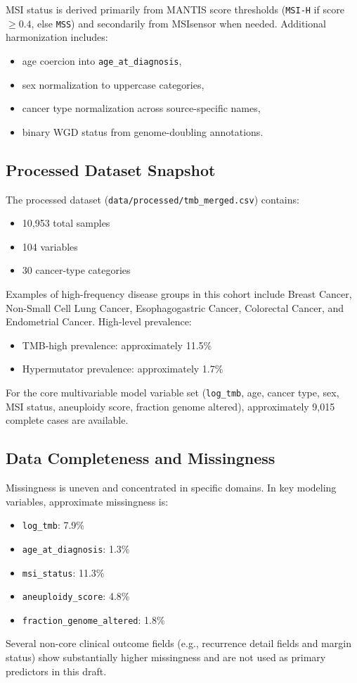 \documentclass[11pt]{article}
\begin{document}
MSI status is derived primarily from MANTIS score thresholds (\texttt{MSI-H} if score $\geq 0.4$, else \texttt{MSS}) and secondarily from MSIsensor when needed. Additional harmonization includes:
\begin{itemize}
    \item age coercion into \texttt{age\_at\_diagnosis},
    \item sex normalization to uppercase categories,
    \item cancer type normalization across source-specific names,
    \item binary WGD status from genome-doubling annotations.
\end{itemize}

\subsection{Processed Dataset Snapshot}
The processed dataset (\texttt{data/processed/tmb\_merged.csv}) contains:
\begin{itemize}
    \item 10,953 total samples
    \item 104 variables
    \item 30 cancer-type categories
\end{itemize}
Examples of high-frequency disease groups in this cohort include Breast Cancer, Non-Small Cell Lung Cancer, Esophagogastric Cancer, Colorectal Cancer, and Endometrial Cancer. High-level prevalence:
\begin{itemize}
    \item TMB-high prevalence: approximately 11.5\%
    \item Hypermutator prevalence: approximately 1.7\%
\end{itemize}
For the core multivariable model variable set (\texttt{log\_tmb}, age, cancer type, sex, MSI status, aneuploidy score, fraction genome altered), approximately 9,015 complete cases are available.

\subsection{Data Completeness and Missingness}
Missingness is uneven and concentrated in specific domains. In key modeling variables, approximate missingness is:
\begin{itemize}
    \item \texttt{log\_tmb}: 7.9\%
    \item \texttt{age\_at\_diagnosis}: 1.3\%
    \item \texttt{msi\_status}: 11.3\%
    \item \texttt{aneuploidy\_score}: 4.8\%
    \item \texttt{fraction\_genome\_altered}: 1.8\%
\end{itemize}
Several non-core clinical outcome fields (e.g., recurrence detail fields and margin status) show substantially higher missingness and are not used as primary predictors in this draft.
\end{document}

